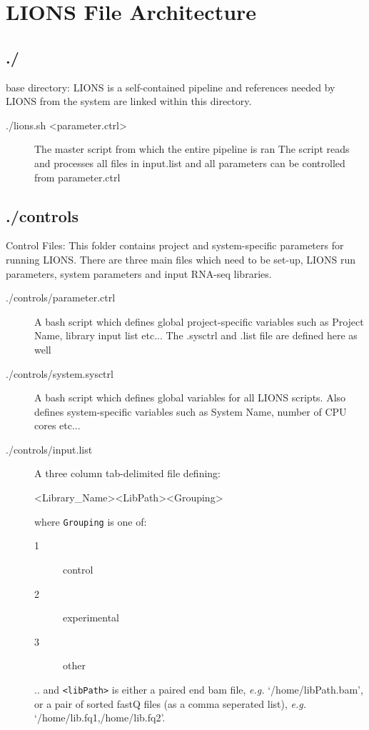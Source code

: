 \documentclass[11pt]{scrartcl}
\newcommand{\arrows}[1]{\textless #1\textgreater}
\begin{document}
\clearpage
\section{LIONS File Architecture}

\subsection{./}
  base directory:  LIONS is a self-contained pipeline and 
  references needed by LIONS from the system are linked
  within this directory.

\begin{description}
\item[./lions.sh \arrows{parameter.ctrl}]
    The master script from which the entire pipeline is ran
    The script reads and processes all files in input.list
    and all parameters can be controlled from parameter.ctrl
\end{description}

\subsection{./controls}
\label{controls}
  Control Files: This folder contains project and system-specific
  parameters for running LIONS. There are three main files which
  need to be set-up, LIONS run parameters, system parameters and
  input RNA-seq libraries.
  
\begin{description}
\item[./controls/parameter.ctrl]
    A bash script which defines global project-specific 
    variables such as Project Name, library input list etc...
    The .sysctrl and .list file are defined here as well

\item[./controls/system.sysctrl]
    A bash script which defines global variables for all LIONS
    scripts. Also defines system-specific variables such as
    System Name, number of CPU cores etc...

\item[./controls/input.list]
    A three column tab-delimited file defining:

    \arrows{Library\_Name}\hspace{2em}\arrows{LibPath}\hspace{2em}\arrows{Grouping}

where \texttt{Grouping} is one of:
\begin{center}
    \begin{description}
    \item[1] control
    \item[2] experimental
    \item[3] other
    \end{description}
\end{center}
 .. and \texttt{<libPath>} is either a paired end bam file, \textit{e.g.} `/home/libPath.bam', or a pair of sorted fastQ files (as a comma seperated list), \textit{e.g.} `/home/lib.fq1,/home/lib.fq2'.
\end{description}
    
\end{document}
